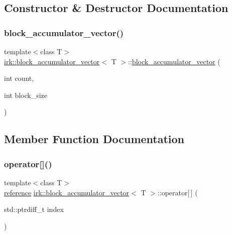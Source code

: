 \subsection{Constructor \& Destructor Documentation}
\mbox{\label{structirk_1_1block__accumulator__vector_adb288a669ee2b526f19479fd5702bd8d}} 
\subsubsection{\texorpdfstring{block\+\_\+accumulator\+\_\+vector()}{block\_accumulator\_vector()}}
{\footnotesize\ttfamily template$<$class T$>$ \\
\mbox{\hyperlink{structirk_1_1block__accumulator__vector}{irk\+::block\+\_\+accumulator\+\_\+vector}}$<$ T $>$\+::\mbox{\hyperlink{structirk_1_1block__accumulator__vector}{block\+\_\+accumulator\+\_\+vector}} (\begin{DoxyParamCaption}\item[{int}]{count,  }\item[{int}]{block\+\_\+size }\end{DoxyParamCaption})\hspace{0.3cm}{\ttfamily [inline]}}



\subsection{Member Function Documentation}
\mbox{\label{structirk_1_1block__accumulator__vector_a307fe30226bc7fc0952352f95cd11f03}} 
\subsubsection{\texorpdfstring{operator[]()}{operator[]()}}
{\footnotesize\ttfamily template$<$class T$>$ \\
\mbox{\hyperlink{structirk_1_1block__accumulator__vector_1_1reference}{reference}} \mbox{\hyperlink{structirk_1_1block__accumulator__vector}{irk\+::block\+\_\+accumulator\+\_\+vector}}$<$ T $>$\+::operator\mbox{[}$\,$\mbox{]} (\begin{DoxyParamCaption}\item[{std\+::ptrdiff\+\_\+t}]{index }\end{DoxyParamCaption})\hspace{0.3cm}{\ttfamily [inline]}}



